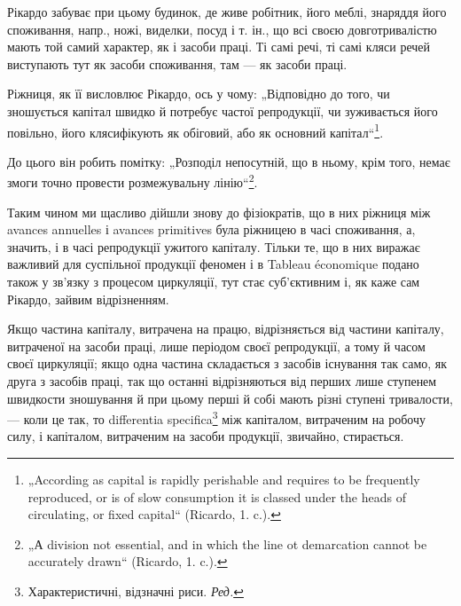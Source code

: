 Рікардо забуває при цьому будинок, де живе робітник, його меблі,
знаряддя його споживання, напр., ножі, виделки, посуд і т. ін., що всі
своєю довготривалістю мають той самий характер, як і засоби праці. Ті
самі речі, ті самі кляси речей виступають тут як засоби споживання,
там — як засоби праці.

Ріжниця, як її висловлює Рікардо, ось у чому: „Відповідно до того,
чи зношується капітал швидко й потребує частої репродукції, чи зуживається
його повільно, його клясифікують як обіговий, або як основний
капітал“\footnote{
„According as capital is rapidly perishable and requires to be frequently
reproduced, or is of slow consumption it is classed under the heads of circulating,
or fixed capital“ (Ricardo, 1. c.).
}.

До цього він робить помітку: „Розподіл непосутній, що в ньому, крім
того, немає змоги точно провести розмежувальну лінію“\footnote{
„А division not essential, and in which the line ot demarcation cannot be
accurately drawn“ (Ricardo, 1. c.).
}.

Таким чином ми щасливо дійшли знову до фізіократів, що в них
ріжниця між avances annuelles і avances primitives була ріжницею в часі
споживання, а, значить, і в часі репродукції ужитого капіталу. Тільки те,
що в них виражає важливий для суспільної продукції феномен і в Tableau
économique подано також у зв’язку з процесом циркуляції, тут стає
суб’єктивним і, як каже сам Рікардо, зайвим відрізненням.

Якщо частина капіталу, витрачена на працю, відрізняється від частини
капіталу, витраченої на засоби праці, лише періодом своєї репродукції,
а тому й часом своєї циркуляції; якщо одна частина складається з засобів
існування так само, як друга з засобів праці, так що останні відрізняються
від перших лише ступенем швидкости зношування й при цьому
перші й собі мають різні ступені тривалости, — коли це так, то differentia
specifica\footnote*{
Характеристичні, відзначні риси. \emph{Ред.}
} між капіталом, витраченим на робочу силу, і капіталом, витраченим
на засоби продукції, звичайно, стирається.

